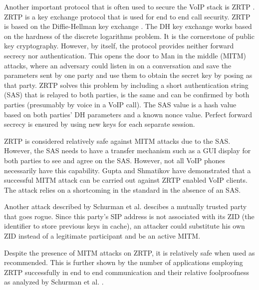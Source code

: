 Another important protocol that is often used to secure the VoIP stack is ZRTP \cite{rfc}. ZRTP is a key exchange protocol that is used for end to end call security. ZRTP is based on the Diffie-Hellman key exchange \cite{dh}. The DH key exchange works based on the hardness of the discrete logarithms problem. It is the cornerstone of public key cryptography. However, by itself, the protocol provides neither forward secrecy nor authentication. This opens the door to Man in the middle (MITM) attacks, where an adversary could listen in on a conversation and save the parameters sent by one party and use them to obtain the secret key by posing as that party. ZRTP solves this problem by including a short authentication string (SAS) that is relayed to both parties, is the same and can be confirmed by both parties (presumably by voice in a VoIP call). The SAS value is a hash value based on both parties' DH parameters and a known nonce value. Perfect forward secrecy is ensured by using new keys for each separate session. 

ZRTP is considered relatively safe against MITM attacks due to the SAS. However, the SAS needs to have a transfer mechanism such as a GUI display for both parties to see and agree on the SAS. However, not all VoIP phones necessarily have this capability. Gupta and Shmatikov \cite{vmware} have demonstrated that a successful MITM attack can be carried out against ZRTP enabled VoIP clients. The attack relies on a shortcoming in the standard in the absence of an SAS.

Another attack described by Schurman et al. \cite{schurman} descibes a mutually trusted party that goes rogue. Since this party's SIP address is not associated with its ZID (the identifier to store previous keys in cache), an attacker could substitute his own ZID instead of a legitimate participant and be an active MITM.

Despite the presence of MITM attacks on ZRTP, it is relatively safe when used as recommended. This is further shown by the number of  applications employing ZRTP successfully in end to end communication and their relative foolproofness as analyzed by Schurman et al. \cite{schurman}.